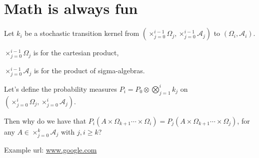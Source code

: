 \documentclass[a4paper,12pt]{amsart}
\begin{document}
\section{Math is always fun}

Let $k_i$ be a stochastic transition kernel from $(\times_{j=0}^{i-1} \Omega_j,\times_{j=0}^{i-1} \mathcal{A}_j)$ to $(\Omega_i,\mathcal{A}_i)$.


$\times_{j=0}^{i-1} \Omega_j$ is for the cartesian product, 

$\times_{j=0}^{i-1} \mathcal{A}_j$ is for the product of sigma-algebras.

Let's define the probability measures $P_i=P_0\otimes\bigotimes^i_{j=1}k_j$ on $(\times_{j=0}^{i} \Omega_j,\times_{j=0}^{i} \mathcal{A}_j)$.

Then why do we have that $P_i(A\times \Omega_{k+1} \cdots \times \Omega_{i})=P_j(A\times \Omega_{k+1} \cdots \times \Omega_{j})$, for any $A \in \times_{j=0}^{k} \mathcal{A}_j$ with $j,i\geq k$?

\newpage\begin{thebibliography}{[XXX]}

Example url: \url{www.google.com}

\end{thebibliography}
\end{document}
